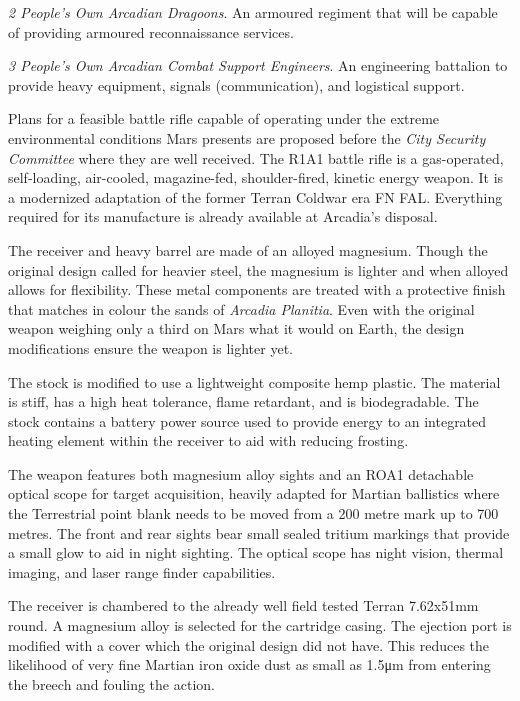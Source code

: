 \item {\it 2 People's Own Arcadian Dragoons}. An armoured regiment that will be capable of providing armoured reconnaissance services.

\item {\it 3 People's Own Arcadian Combat Support Engineers}. An engineering battalion to provide heavy equipment, signals (communication), and logistical support.
\stopitemize
\StopTimelineDate

Plans for a feasible battle rifle capable of operating under the extreme environmental conditions Mars presents are proposed before the {\it City Security Committee} where they are well received. The R1A1 battle rifle is a gas-operated, self-loading, air-cooled, magazine-fed, shoulder-fired, kinetic energy weapon. It is a modernized adaptation of the former Terran Coldwar era FN FAL. Everything required for its manufacture is already available at Arcadia's disposal.

The receiver and heavy barrel are made of an alloyed magnesium. Though the original design called for heavier steel, the magnesium is lighter and when alloyed allows for flexibility. These metal components are treated with a protective finish that matches in colour the sands of {\it Arcadia Planitia}. Even with the original weapon weighing only a third on Mars what it would on Earth, the design modifications ensure the weapon is lighter yet.

The stock is modified to use a lightweight composite hemp plastic. The material is stiff, has a high heat tolerance, flame retardant, and is biodegradable. The stock contains a battery power source used to provide energy to an integrated heating element within the receiver to aid with reducing frosting.

The weapon features both magnesium alloy sights and an ROA1 detachable optical scope for target acquisition, heavily adapted for Martian ballistics where the Terrestrial point blank needs to be moved from a 200 metre mark up to 700 metres. The front and rear sights bear small sealed tritium markings that provide a small glow to aid in night sighting. The optical scope has night vision, thermal imaging, and laser range finder capabilities.

The receiver is chambered to the already well field tested Terran 7.62x51mm round. A magnesium alloy is selected for the cartridge casing. The ejection port is modified with a cover which the original design did not have. This reduces the likelihood of very fine Martian iron oxide dust as small as 1.5μm from entering the breech and fouling the action.

